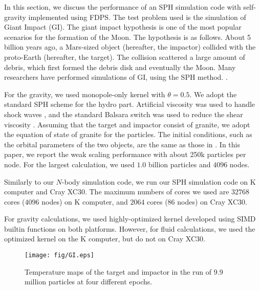 In this section, we discuss the performance of an SPH simulation code
with self-gravity implemented using FDPS. The test problem used is the
simulation of Giant Impact (GI). The giant impact
hypothesis \cite{1975Icar...24..504H, 1976LPI.....7..120C} is one of
the most popular scenarios for the formation of the Moon. The
hypothesis is as follows. About 5 billion years ago, a Mars-sized
object (hereafter, the impactor) collided with the proto-Earth
(hereafter, the target). The collision scattered a large amount of
debris, which first formed the debris disk and eventually the
Moon. Many researchers have performed simulations of GI, using the SPH
method.
\cite{1986Icar...66..515B, 2013Icar..222..200C, 2014NatGe...7..564A}.

For the gravity, we used monopole-only kernel with $\theta=0.5$. We
adopt the standard SPH scheme
\cite{1992ARA&A..30..543M, 2009NewAR..53...78R, 2010ARA&A..48..391S}
for the hydro part. Artificial viscosity was used to handle shock waves
\cite{1997JCoPh.136..298M}, and 
the standard Balsara switch was used to reduce the shear viscosity
\cite{1995JCoPh.121..357B}. Assuming that the target and impactor
consist of granite, we adopt the equation of state of
granite \cite{1986Icar...66..515B} for the particles. The initial
conditions, such as the orbital parameters of the two objects, are the
same as those in \cite{1986Icar...66..515B}. In this paper, we report
the weak scaling performance with about 250k particles per node. For
the largest calculation, we used $1.0$ billion particles and $4096$
nodes.

Similarly to our $N$-body simulation code, we run our SPH simulation
code on K computer and Cray XC30. The maximum numbers of cores we used
are $32768$ cores ($4096$ nodes) on K computer, and $2064$ cores ($86$
nodes) on Cray XC30.

For gravity calculations, we used highly-optimized kernel developed
using SIMD builtin functions on both platforms. However, for fluid
calculations, we used the optimized kernel on the K computer, but do
not on Cray XC30.

\begin{figure}
  \begin{center}
    \texttt{[image: fig/GI.eps]}
  \end{center}
  \caption{Temperature maps of the target and impactor in the run of
  $9.9$ million particles at four different epochs. }
  \label{fig:evolutionGI}
\end{figure}

